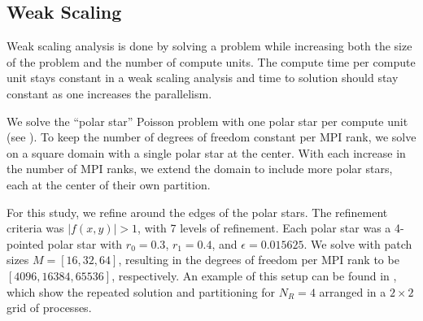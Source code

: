 
\subsection{Weak Scaling}
\label{sub:weak-scaling}

Weak scaling analysis is done by solving a problem while increasing both the size of the problem and the number of compute units. The compute time per compute unit stays constant in a weak scaling analysis and time to solution should stay constant as one increases the parallelism.

We solve the ``polar star'' Poisson problem with one polar star per compute unit (see ). To keep the number of degrees of freedom constant per MPI rank, we solve on a square domain with a single polar star at the center. With each increase in the number of MPI ranks, we extend the domain to include more polar stars, each at the center of their own partition.

For this study, we refine around the edges of the polar stars. The refinement criteria was $|f(x,y)| > 1$, with 7 levels of refinement. Each polar star was a 4-pointed polar star with $r_0 = 0.3$, $r_1 = 0.4$, and $\epsilon = 0.015625$. We solve with patch sizes $M = [16, 32, 64]$, resulting in the degrees of freedom per MPI rank to be $[4096, 16384, 65536]$, respectively. An example of this setup can be found in , which show the repeated solution and partitioning for $N_R = 4$ arranged in a $2 \times 2$ grid of processes.

